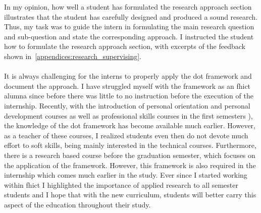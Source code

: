 In my opinion, how well a student has formulated the research approach section illustrates that the student has carefully designed and produced a sound research. 
Thus, my task was to guide the intern in formulating the main research question and sub-question and state the corresponding approach. 
I instructed the student how to formulate the research approach section, with excerpts of the feedback shown in~\cref{appendices:research_supervising}.
\\\\
It is always challenging for the interns to properly apply the \acrshort{dot} framework and document the approach. 
I have struggled myself with the framework as an \acrshort{fhict} alumna since before there was little to no instruction before the execution of the internship. 
Recently, with the introduction of personal orientation and personal development courses as well as professional skills courses in the first semesters \cite{FHICTNewCurriculum}), the knowledge of the \acrshort{dot} framework has become available much earlier. However, as a teacher of these courses, I realized students even then do not devote much effort to soft skills, being mainly interested in the technical courses.
Furthermore, there is a research based course before the graduation semester, which focuses on the application of the framework. However, this framework is also required in the internship which comes much earlier in the study. Ever since I started working within \acrshort{fhict} I highlighted the importance of applied research to all semester students and I hope that with the new curriculum, students will better carry this aspect of the education throughout their study. 
